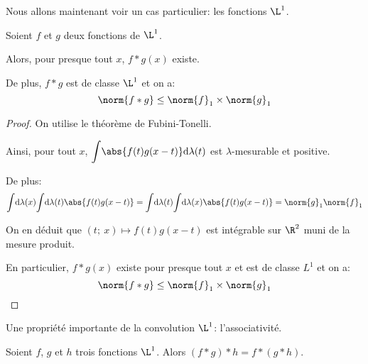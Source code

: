 Nous allons maintenant voir un cas particulier: les fonctions $\L^1$.

\begin{prop}[Convolution $\L^1$ et $\L^1$]
Soient $f$ et $g$ deux fonctions de $\L^1$.

Alors, pour presque tout $x$, $f*g(x)$ existe.

\medskip
De plus, $f*g$ est de classe $\L^1$ et on a:
\[
\norm{f*g} \leq \norm{f}_1 \times \norm{g}_1
\]
\end{prop}

\begin{proof}
On utilise le théorème de Fubini-Tonelli.

Ainsi, pour tout $x$, $ \displaystyle{\int} \abs{f(t)g(x-t)} \mathrm d \lambda(t)$ est $\lambda$-mesurable et positive.

De plus:
\[
\displaystyle{\int} \mathrm d \lambda(x)
\displaystyle{\int} \mathrm d \lambda(t) \abs{f(t)g(x-t)} = \displaystyle{\int} \mathrm d \lambda(t)
\displaystyle{\int} \mathrm d \lambda(x) \abs{f(t)g(x-t)} = \norm{g}_1 \norm{f}_1
\]

On en déduit que $(t;~x) \mapsto f(t)g(x-t)$ est intégrable sur $\R^2$ muni de la mesure produit.

En particulier, $f*g(x)$ existe pour presque tout $x$ et est de classe $L^1$ et on a:
\[
\norm{f*g} \leq \norm{f}_1 \times \norm{g}_1
\]
\end{proof}


Une propriété importante de la convolution $\L^1$: l'associativité.


\begin{prop}[Associativité]
Soient $f$, $g$ et $h$ trois fonctions $\L^1$. Alors $(f*g)*h = f*(g*h)$.
\end{prop}

